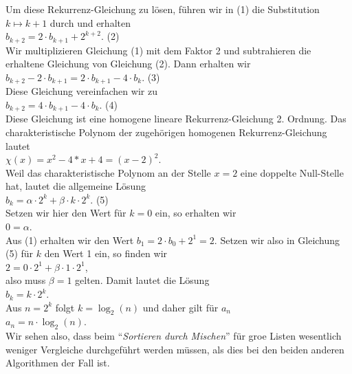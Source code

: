 Um diese Rekurrenz-Gleichung zu l\"osen, f\"uhren wir in (1) die Substitution $k \mapsto k+1$ durch und erhalten \\[0.2cm]
\hspace*{1.3cm}  $b_{k+2} = 2 \cdot b_{k+1} + 2^{k+2}$. \hspace*{\fill} (2) \\[0.2cm]
Wir multiplizieren Gleichung (1) mit dem Faktor 2 und subtrahieren die erhaltene Gleichung von Gleichung (2). 
Dann erhalten wir \\[0.2cm]
\hspace*{1.3cm}  $b_{k+2} - 2 \cdot b_{k+1} = 2 \cdot b_{k+1} - 4 \cdot b_k$. \hspace*{\fill} (3) \\[0.2cm]
Diese Gleichung vereinfachen wir zu \\[0.2cm]
\hspace*{1.3cm}  $b_{k+2} = 4 \cdot b_{k+1} - 4 \cdot b_k$. \hspace*{\fill} (4) \\[0.2cm]
Diese Gleichung ist eine homogene lineare Rekurrenz-Gleichung 2. Ordnung.
Das charakteristische Polynom der zugeh\"origen homogenen Rekurrenz-Gleichung lautet \\[0.2cm]
\hspace*{1.3cm} $\displaystyle \chi(x) = x^2 - 4 *x + 4 = (x-2)^2$. \\[0.2cm]
Weil das charakteristische Polynom an der Stelle $x=2$ eine doppelte Null-Stelle hat, 
lautet die allgemeine L\"osung \\[0.2cm]
\hspace*{1.3cm} $\displaystyle b_k = \alpha \cdot 2^k + \beta \cdot k \cdot 2^k$. \hspace*{\fill} (5) \\[0.2cm]
Setzen wir hier den Wert f\"ur $k=0$ ein, so erhalten wir \\[0.2cm]
\hspace*{1.3cm} $0 = \alpha$. \\[0.2cm]
Aus (1) erhalten wir den Wert $b_1 = 2 \cdot b_0 + 2^1 = 2$.  Setzen wir also in Gleichung (5) f\"ur $k$ den Wert 1 ein, 
so finden wir \\[0.2cm]
\hspace*{1.3cm} $2 = 0 \cdot 2^1 + \beta \cdot 1 \cdot 2^1$,  \\[0.2cm]
also muss $\beta = 1$ gelten.  Damit lautet die L\"osung \\[0.2cm]
\hspace*{1.3cm} $b_k = k \cdot 2^k$. \\[0.2cm]
Aus $n = 2^k$ folgt $k = \log_2(n)$ und daher gilt f\"ur $a_n$ \\[0.2cm]
\hspace*{1.3cm} $a_n = n \cdot \log_2(n)$. \\[0.2cm]
Wir sehen also, dass beim ``\emph{Sortieren durch Mischen}'' f\"ur gro\3e Listen wesentlich weniger Vergleiche
durchgef\"uhrt werden m\"ussen, als dies bei den beiden anderen Algorithmen der Fall ist.

